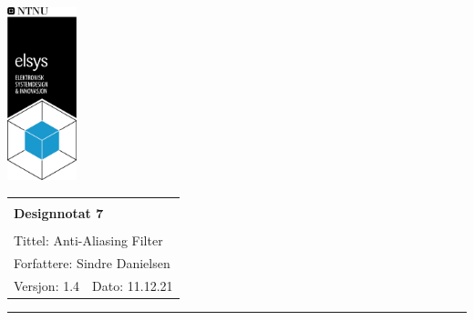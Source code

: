 \documentclass[a4paper,11pt,norsk]{article}
\begin{document}
\begin{minipage}[c]{0.15\textwidth}
\includegraphics[width=2.0cm]{elsys_pos_staaende_ntnu.png}
\end{minipage}
\begin{minipage}[c]{0.85\textwidth}

\renewcommand{\arraystretch}{1.7}
\large 
\begin{tabularx}{\textwidth}{|X|X|}
\hline
\multicolumn{2}{|l|}{} \\
\multicolumn{2}{|l|}{\huge \textbf{Designnotat 7}} \\
\multicolumn{2}{|l|}{}  \\
\hline
\multicolumn{2}{|l|}{Tittel: 
Anti-Aliasing Filter
} \\
\hline
\multicolumn{2}{|l|}{Forfattere: 
Sindre Danielsen
} \\
\hline
Versjon: 1.4 & Dato: 11.12.21
\\
\hline 
\end{tabularx}
\end{minipage}
\normalsize


\setlength{\parskip}{0ex}
\renewcommand{\baselinestretch}{0.1}\normalsize
\tableofcontents
\renewcommand{\baselinestretch}{1.00}\normalsize
\setlength{\parskip}{2ex}
\rule{\textwidth}{1pt}

\newpage
\end{document}
